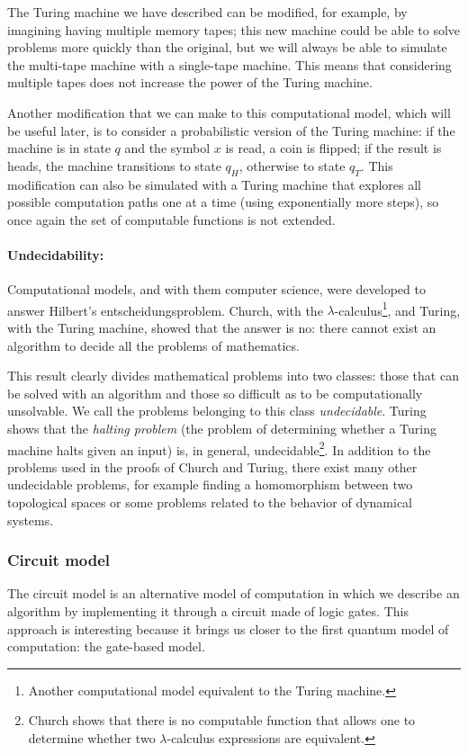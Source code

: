 The Turing machine we have described can be modified, for example, by imagining having multiple memory tapes; this new machine could be able to solve problems more quickly than the original, but we will always be able to simulate the multi-tape machine with a single-tape machine. This means that considering multiple tapes does not increase the power of the Turing machine.

Another modification that we can make to this computational model, which will be useful later, is to consider a probabilistic version of the Turing machine: if the machine is in state $q$ and the symbol $x$ is read, a coin is flipped; if the result is heads, the machine transitions to state $q_H$, otherwise to state $q_T$. This modification can also be simulated with a Turing machine that explores all possible computation paths one at a time (using exponentially more steps), so once again the set of computable functions is not extended.

\paragraph{Undecidability:} Computational models, and with them computer science, were developed to answer Hilbert's entscheidungsproblem. Church, with the $\lambda$-calculus\footnote{Another computational model equivalent to the Turing machine.}, and Turing, with the Turing machine, showed that the answer is no: there cannot exist an algorithm to decide all the problems of mathematics.

This result clearly divides mathematical problems into two classes: those that can be solved with an algorithm and those so difficult as to be computationally unsolvable. We call the problems belonging to this class \emph{undecidable}. Turing shows that the \emph{halting problem} (the problem of determining whether a Turing machine halts given an input) is, in general, undecidable\footnote{Church shows that there is no computable function that allows one to determine whether two $\lambda$-calculus expressions are equivalent.}. In addition to the problems used in the proofs of Church and Turing, there exist many other undecidable problems, for example finding a homomorphism between two topological spaces or some problems related to the behavior of dynamical systems. 

\subsubsection*{Circuit model}
The circuit model is an alternative model of computation in which we describe an algorithm by implementing it through a circuit made of logic gates. This approach is interesting because it brings us closer to the first quantum model of computation: the gate-based model.


